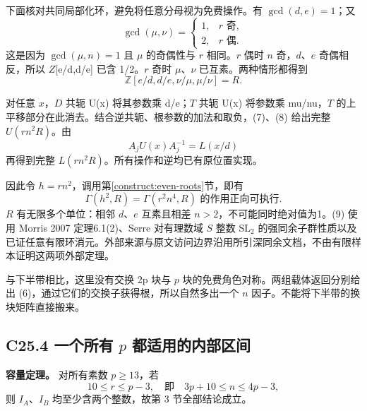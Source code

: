 {下面核对共同局部化环，避免将任意分母视为免费操作。有} {\ensuremath{\operatorname{gcd}(d,e)=1}；又} \[
\gcd(\mu,\nu)=
\begin{cases}1,&r\text{ 奇},\\2,&r\text{ 偶}.\end{cases}
\] {这是因为} {\ensuremath{\operatorname{gcd}(\mu ,n)=1}} {且} {\ensuremath{\mu }} {的奇偶性与} {\ensuremath{r}} {相同。\ensuremath{r}} {偶时} {\ensuremath{n}} {奇，\ensuremath{d}、\ensuremath{e}} {奇偶相反，所以} {\ensuremath{Z}{[}e/d,d/e{]}} {已含} {1/2。\ensuremath{r}} {奇时} {\ensuremath{\mu }、\ensuremath{\nu }} {已互素。两种情形都得到} \[
\mathbb Z[e/d,d/e,\nu/\mu,\mu/\nu]=R.
\tag{C25.8}
\]

{对任意} {\ensuremath{x}，\ensuremath{D}} {共轭} {U(x)} {将其参数乘} {d/e；\ensuremath{T}} {共轭} {U(x)} {将参数乘} {mu/nu，\ensuremath{T}} {的上平移部分在此消去。结合逆共轭、根参数的加法和取负，(7)、(8)} {给出完整} {\ensuremath{U(rn^{2}R)}。由} \[
A_jU(x)A_j^{-1}=L(x/d)
\] {再得到完整} {\ensuremath{L(rn^{2}R)}。所有操作和逆均已有原位置实现。}

{因此令} {\ensuremath{h=rn^{2}}，调用}第\ref{construct:even-roots}节{，即有} \[
\boxed{\Gamma(h^2,R)=\Gamma(r^2n^4,R)
\text{ 的作用正向可执行}.}
\tag{C25.9}
\] {\ensuremath{R}} {有无限多个单位：相邻} {\ensuremath{d}、\ensuremath{e}} {互素且相差} {\ensuremath{n>2}，不可能同时绝对值为1。(9)} {使用} {Morris} {2007} {定理6.1(2)、Serre} {对有理数域} {\ensuremath{S}} {整数} {\ensuremath{\mathrm{SL}_{2}}} {的强同余子群性质以及已证任意有限环消元。外部来源与原文访问边界沿用所引深同余文档，不由有限样本证明这两项外部定理。}

{与下半带相比，这里没有交换} {2p} {块与} {\ensuremath{p}} {块的免费角色对称。两组载体返回分别给出} {(6)，通过它们的交换子获得根，所以自然多出一个} {\ensuremath{n}} {因子。不能将下半带的换块矩阵直接搬来。}

\subsection*{\texorpdfstring{{C25.4} {一个所有} {\ensuremath{p}} {都适用的内部区间}}{C25.4 一个所有  都适用的内部区间}}\label{C25-h157}

\textbf{{容量定理。}} {对所有素数} {\ensuremath{p\ge 13}，若} \[
10\le r\le p-3,
\quad\text{即}\quad
\boxed{3p+10\le n\le4p-3,}
\tag{C25.10}
\] {则} {\ensuremath{I_{A}}、\ensuremath{I_{B}}} {均至少含两个整数，故第} {3} {节全部结论成立。}


